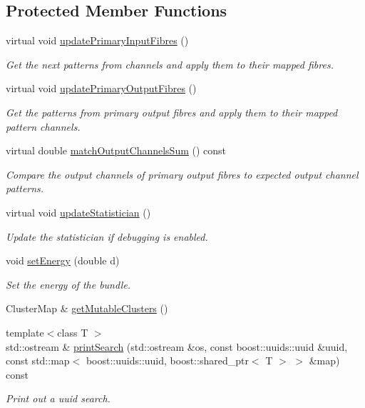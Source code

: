 \subsection*{\-Protected \-Member \-Functions}
\begin{DoxyCompactItemize}
\item 
virtual void \hyperlink{classcryomesh_1_1structures_1_1Bundle_abe52d8718eeb7bb6a17211d4dfbed440}{update\-Primary\-Input\-Fibres} ()
\begin{DoxyCompactList}\small\item\em \-Get the next patterns from channels and apply them to their mapped fibres. \end{DoxyCompactList}\item 
virtual void \hyperlink{classcryomesh_1_1structures_1_1Bundle_a7a95265553776d6216799e143134a59f}{update\-Primary\-Output\-Fibres} ()
\begin{DoxyCompactList}\small\item\em \-Get the patterns from primary output fibres and apply them to their mapped pattern channels. \end{DoxyCompactList}\item 
virtual double \hyperlink{classcryomesh_1_1structures_1_1Bundle_a3a8a7cfb5d525ff59a52dd1a39909621}{match\-Output\-Channels\-Sum} () const 
\begin{DoxyCompactList}\small\item\em \-Compare the output channels of primary output fibres to expected output channel patterns. \end{DoxyCompactList}\item 
virtual void \hyperlink{classcryomesh_1_1structures_1_1Bundle_a804c625c912657cebd3350c7c1b53c10}{update\-Statistician} ()
\begin{DoxyCompactList}\small\item\em \-Update the statistician if debugging is enabled. \end{DoxyCompactList}\item 
void \hyperlink{classcryomesh_1_1structures_1_1Bundle_ae6a553eaab4ddf2b6bbd6bdeca9361ad}{set\-Energy} (double d)
\begin{DoxyCompactList}\small\item\em \-Set the energy of the bundle. \end{DoxyCompactList}\item 
\-Cluster\-Map \& \hyperlink{classcryomesh_1_1structures_1_1Bundle_a14990ba8cec7b9c18426ae8c2fdd0dcf}{get\-Mutable\-Clusters} ()
\item 
{\footnotesize template$<$class T $>$ }\\std\-::ostream \& \hyperlink{classcryomesh_1_1structures_1_1Bundle_af89da428bb056c8eea81a416783cf2ae}{print\-Search} (std\-::ostream \&os, const boost\-::uuids\-::uuid \&uuid, const std\-::map$<$ boost\-::uuids\-::uuid, boost\-::shared\-\_\-ptr$<$ \-T $>$ $>$ \&map) const 
\begin{DoxyCompactList}\small\item\em \-Print out a uuid search. \end{DoxyCompactList}\end{DoxyCompactItemize}
